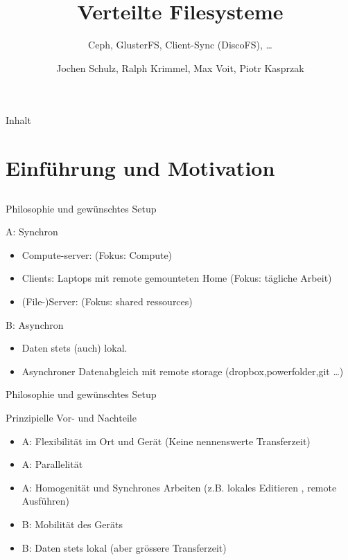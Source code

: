 \documentclass[hyperref={xetex}]{beamer}
\title{Verteilte Filesysteme}
\subtitle{ Ceph, GlusterFS, Client-Sync (DiscoFS), \ldots}
\author{Jochen Schulz, Ralph Krimmel, Max Voit, Piotr Kasprzak}
\begin{document}
	\nocite{*} 
	\begin{frame}
		\titlepage
	\end{frame}

  \begin{frame}{Inhalt}
		\tableofcontents
	\end{frame}


\section{Einf\"uhrung und Motivation}
\subsection*{}

\begin{frame}{Philosophie und gewünschtes Setup}
    \begin{block}{A: Synchron}
    \begin{itemize}    
        \item Compute-server: (Fokus: Compute)
        \item Clients: Laptops mit remote gemounteten Home (Fokus: tägliche Arbeit)
        \item (File-)Server: (Fokus: shared ressources)
    \end{itemize}
\end{block}

\begin{block}{B: Asynchron}
    \begin{itemize}
                    \item  Daten stets (auch) lokal. 
                    \item Asynchroner Datenabgleich mit remote storage (dropbox,powerfolder,git \ldots )
                \end{itemize}

\end{block}
\end{frame}

\begin{frame}{Philosophie und gewünschtes Setup}

\begin{block}{Prinzipielle Vor- und Nachteile}
    \begin{itemize}
        \item A: Flexibilität im Ort und Gerät (Keine nennenswerte Transferzeit)
        \item A: Parallelität
        \item A: Homogenität und Synchrones Arbeiten (z.B. lokales Editieren , remote Ausführen)
        \item B: Mobilität des Geräts
        \item B: Daten stets lokal (aber grössere Transferzeit)
    \end{itemize}
    
\end{block}
    

\end{frame}
\end{document}
